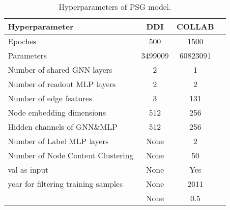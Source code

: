 \documentclass[sigconf]{acmart}
\begin{document}
\begin{table}[htbp]
    \centering
    \caption{Hyperparameters of PSG model.}\label{tab_param}
    \begin{tabular}{lccc}
    \hline
    Hyperparameter                                    & DDI & COLLAB         \\ \hline
    Epoches                                & 500     &    1500           \\
    Parameters                                & 3499009       &   60823091          \\
    Number of shared GNN layers                                & 2     &      1         \\
    Number of readout MLP layers                                & 2         &     2      \\
    Number of edge features                              & 3    &        131        \\
    Node embedding dimensions       & 512     &    256         \\
    Hidden channels of GNN\&MLP    & 512   &    256            \\
    Number of Label MLP layers                                & None       &     2      \\
    Number of Node Content Clustering                 & None       &     50      \\
    val as input                                & None       &     Yes      \\
    year for filtering training samples                    & None       &     2011      \\
                                    & None       &     0.5      \\
    \hline
    \end{tabular}
\end{table}
\end{document}
